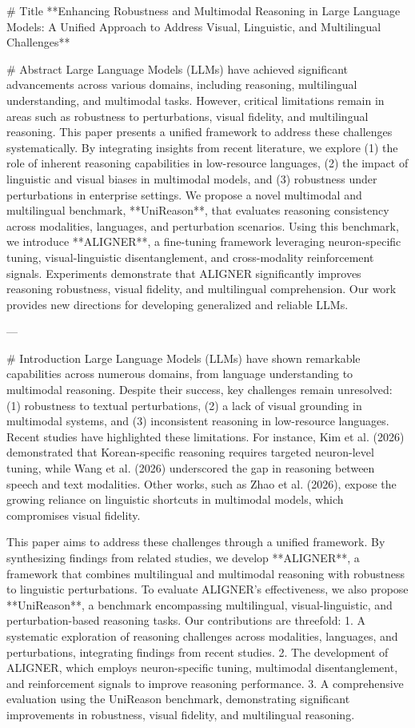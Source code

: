 # Title
**Enhancing Robustness and Multimodal Reasoning in Large Language Models: A Unified Approach to Address Visual, Linguistic, and Multilingual Challenges**

# Abstract
Large Language Models (LLMs) have achieved significant advancements across various domains, including reasoning, multilingual understanding, and multimodal tasks. However, critical limitations remain in areas such as robustness to perturbations, visual fidelity, and multilingual reasoning. This paper presents a unified framework to address these challenges systematically. By integrating insights from recent literature, we explore (1) the role of inherent reasoning capabilities in low-resource languages, (2) the impact of linguistic and visual biases in multimodal models, and (3) robustness under perturbations in enterprise settings. We propose a novel multimodal and multilingual benchmark, **UniReason**, that evaluates reasoning consistency across modalities, languages, and perturbation scenarios. Using this benchmark, we introduce **ALIGNER**, a fine-tuning framework leveraging neuron-specific tuning, visual-linguistic disentanglement, and cross-modality reinforcement signals. Experiments demonstrate that ALIGNER significantly improves reasoning robustness, visual fidelity, and multilingual comprehension. Our work provides new directions for developing generalized and reliable LLMs.

---

# Introduction
Large Language Models (LLMs) have shown remarkable capabilities across numerous domains, from language understanding to multimodal reasoning. Despite their success, key challenges remain unresolved: (1) robustness to textual perturbations, (2) a lack of visual grounding in multimodal systems, and (3) inconsistent reasoning in low-resource languages. Recent studies have highlighted these limitations. For instance, Kim et al. (2026) demonstrated that Korean-specific reasoning requires targeted neuron-level tuning, while Wang et al. (2026) underscored the gap in reasoning between speech and text modalities. Other works, such as Zhao et al. (2026), expose the growing reliance on linguistic shortcuts in multimodal models, which compromises visual fidelity.

This paper aims to address these challenges through a unified framework. By synthesizing findings from related studies, we develop **ALIGNER**, a framework that combines multilingual and multimodal reasoning with robustness to linguistic perturbations. To evaluate ALIGNER’s effectiveness, we also propose **UniReason**, a benchmark encompassing multilingual, visual-linguistic, and perturbation-based reasoning tasks. Our contributions are threefold:
1. A systematic exploration of reasoning challenges across modalities, languages, and perturbations, integrating findings from recent studies.
2. The development of ALIGNER, which employs neuron-specific tuning, multimodal disentanglement, and reinforcement signals to improve reasoning performance.
3. A comprehensive evaluation using the UniReason benchmark, demonstrating significant improvements in robustness, visual fidelity, and multilingual reasoning.

